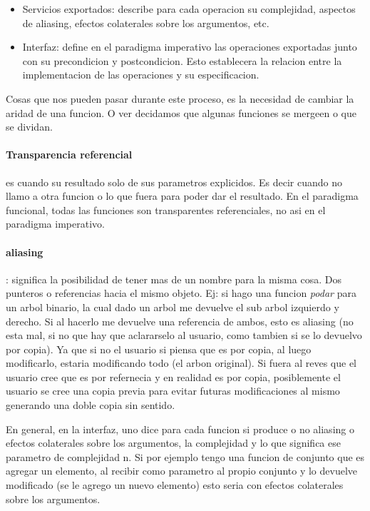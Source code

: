 \documentclass[11pt]{article}
\begin{document}
\begin{itemize}
    \item Servicios exportados: describe para cada operacion su complejidad, aspectos
        de aliasing, efectos colaterales sobre los argumentos, etc.
    \item Interfaz: define en el paradigma imperativo las operaciones exportadas
        junto con su precondicion y postcondicion.
        Esto establecera la relacion entre la implementacion de las operaciones
        y su especificacion.
\end{itemize}

Cosas que nos pueden pasar durante este proceso, es la necesidad de cambiar la aridad
de una funcion.
O ver decidamos que algunas funciones se mergeen o que se dividan.

\paragraph{Transparencia referencial} es cuando su resultado solo de sus parametros
explicidos.
Es decir cuando no llamo a otra funcion o lo que fuera para poder dar el resultado.
En el paradigma funcional, todas las funciones son transparentes referenciales,
no asi en el paradigma imperativo.
\paragraph{aliasing}: significa la posibilidad de tener mas de un nombre para
la misma cosa.
Dos punteros o referencias hacia el mismo objeto.
Ej: si hago una funcion \textit{podar} para un arbol binario, la cual dado un arbol
me devuelve el sub arbol izquierdo y derecho.
Si al hacerlo me devuelve una referencia de ambos, esto es aliasing (no esta mal,
si no que hay que aclararselo al usuario, como tambien si se lo devuelvo por copia).
Ya que si no el usuario si piensa que es por copia, al luego modificarlo, estaria
modificando todo (el arbon original).
Si fuera al reves que el usuario cree que es por refernecia y en realidad es por copia,
posiblemente el usuario se cree una copia previa para evitar futuras modificaciones
al mismo generando una doble copia sin sentido.

En general, en la interfaz, uno dice para cada funcion si produce o no aliasing o efectos colaterales
sobre los argumentos, la complejidad y lo que significa ese parametro de complejidad n.
Si por ejemplo tengo una funcion de conjunto que es agregar un elemento, al recibir
como parametro al propio conjunto y lo devuelve modificado (se le agrego un nuevo elemento)
esto seria con efectos colaterales sobre los argumentos.
\end{document}
